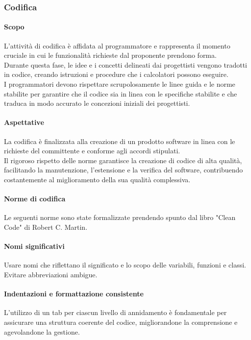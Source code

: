 \subsubsection{Codifica}
\paragraph{Scopo}
L'attività di codifica è affidata al programmatore e rappresenta il momento cruciale in cui le funzionalità richieste dal proponente prendono forma. \\
Durante questa fase, le idee e i concetti delineati dai progettisti vengono tradotti in codice, creando istruzioni e procedure che i calcolatori possono eseguire. \\
I programmatori devono rispettare scrupolosamente le linee guida e le norme stabilite per garantire che il codice sia in linea con le specifiche stabilite e che traduca in modo accurato le concezioni iniziali dei progettisti.
\paragraph{Aspettative}
La codifica è finalizzata alla creazione di un prodotto software in linea con le richieste del committente e conforme agli accordi stipulati.\\
Il rigoroso rispetto delle norme garantisce la creazione di codice di alta qualità, facilitando la manutenzione, l'estensione e la verifica del software, contribuendo costantemente al miglioramento della sua qualità complessiva.
\paragraph{Norme di codifica}
Le seguenti norme sono state formalizzate prendendo spunto dal libro "Clean Code" di Robert C. Martin.

\paragraph*{Nomi significativi}
Usare nomi che riflettano il significato e lo scopo delle variabili, funzioni e classi. Evitare abbreviazioni ambigue.
\paragraph*{Indentazioni e formattazione consistente}
L'utilizzo di un tab per ciascun livello di annidamento è fondamentale per assicurare una struttura coerente del codice, migliorandone la comprensione e agevolandone la gestione.
